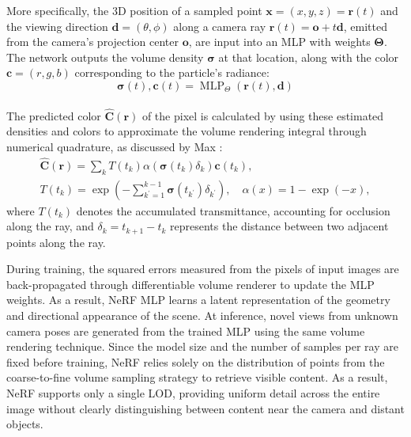 More specifically, the 3D position of a sampled point $\textbf{x} = (x,y,z) = \textbf{r}(t)$ and the viewing direction $\textbf{d} = (\theta,\phi)$ along a camera ray $\textbf{r}(t) = \textbf{o} + t\textbf{d}$, emitted from the camera's projection center $\textbf{o}$, are input into an MLP with weights $\boldsymbol\Theta$. The network outputs the volume density $\boldsymbol\sigma$ at that location, along with the color $\textbf{c} = (r, g, b)$ corresponding to the particle's radiance:
$$
\boldsymbol\sigma(t), \textbf{c}(t)=\operatorname{MLP}_{\Theta}(\textbf{r}(t), \textbf{d})
$$
\\
The predicted color $\hat{\mathbf{C}}(\mathbf{r})$ of the pixel is calculated by using these estimated densities and colors to approximate the volume rendering integral through numerical quadrature, as discussed by Max \cite{Max1995OpticalMF}:
$$
\begin{gathered}
\hat{\mathbf{C}}(\mathbf{r})=\sum_k T\left(t_k\right) \alpha\left(\boldsymbol\sigma\left(t_k\right) \delta_k\right) \textbf{c}\left(t_k\right), \\
T\left(t_k\right)=\exp \left(-\sum_{k^{\prime}=1}^{k-1} \boldsymbol\sigma\left(t_{k^{\prime}}\right) \delta_{k^{\prime}}\right), \quad \alpha(x)=1-\exp (-x),
\end{gathered}
$$
where $T\left(t_k\right)$ denotes the accumulated transmittance, accounting for occlusion along the ray, and $ \delta_k = t_{k+1} - t_k $ represents the distance between two adjacent points along the ray.

During training, the squared errors measured from the pixels of input images are back-propagated through differentiable volume renderer to update the MLP weights. 
As a result, NeRF MLP learns a latent representation of the geometry and directional appearance of the scene. 
At inference, novel views from unknown camera poses are generated from the trained MLP using the same volume rendering technique.
Since the model size and the number of samples per ray are fixed before training, NeRF relies solely on the distribution of points from the coarse-to-fine volume sampling strategy to retrieve visible content.
As a result, NeRF supports only a single LOD, providing uniform detail across the entire image without clearly distinguishing between content near the camera and distant objects.

